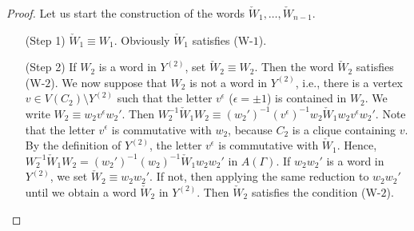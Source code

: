 \documentclass{amsart}
\theoremstyle{definition}
\theoremstyle{plain}
\numberwithin{equation}{section}
\begin{document}
\begin{proof}
Let us start the construction of the words $\check{W}_1, \ldots, \check{W}_{n-1}$. 


\begin{enumerate}
 \item[(Step 1)] $\check{W}_1 \equiv W_1$. 
 Obviously $\check{W}_1$ satisfies (W-$1$). 
 \item[(Step 2)] If $W_2$ is a word in $Y^{(2)}$, set $\check{W}_2 \equiv W_2$. 
 Then the word $\check{W}_2$ satisfies (W-$2$). 
 We now suppose that $W_2$ is not a word in $Y^{(2)}$,  i.e., there is a vertex $v \in V(C_2) \setminus Y^{(2)}$ such that the letter $v^{\epsilon}$ ($\epsilon = \pm 1$) is contained in $W_2$. 
We write $W_2 \equiv w_2 v^{\epsilon} w_2'$. 
Then $W_2^{-1} \check{W}_1 W_2 \equiv (w_2')^{-1} (v^{\epsilon})^{-1} w_2 \check{W}_1 w_2 v^{\epsilon} w_2'$. 
Note that the letter $v^{\epsilon}$ is commutative with $w_2$, because $C_2$ is a clique containing $v$. 
By the definition of $Y^{(2)}$, the letter $v^{\epsilon}$ is commutative with $\check{W}_1$. 
Hence, $W_2^{-1} \check{W}_1 W_2 = (w_2')^{-1} (w_2)^{-1} \check{W}_1 w_2 w_2'$ in $A(\Gamma)$. 
If $w_2 w_2'$ is a word in $Y^{(2)}$, we set $\check{W}_2 \equiv w_2 w_2'$. 
If not, then applying the same reduction to $w_2 w_2'$
until we obtain a word $\check{W}_2$ in $Y^{(2)}$. 
Then $\check{W}_2$ satisfies the condition (W-$2$). 


\end{enumerate}
\end{proof}
\end{document}
